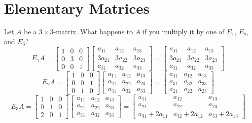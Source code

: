 \section{Elementary Matrices}
Let $A$ be a $3 \times 3$-matrix. What happens to $A$ if you multiply it by 
one of $E_1$, $E_2$, and $E_3$?
\\[8pt]
\[
  E_1A = \begin{bmatrix}
    1 & 0 & 0 \\
    0 & 3 & 0 \\
    0 & 0 & 1
  \end{bmatrix} \begin{bmatrix}
    a_{11} & a_{12} & a_{13} \\
    3a_{21} & 3a_{22} & 3a_{23} \\
    a_{31} & a_{32} & a_{33}
  \end{bmatrix} = \begin{bmatrix}
    a_{11} & a_{12} & a_{13} \\
    3a_{21} & 3a_{22} & 3a_{23} \\
    a_{31} & a_{32} & a_{33} 
  \end{bmatrix}
\]
\[
  E_2A = \begin{bmatrix}
    1 & 0 & 0 \\
    0 & 0 & 1 \\
    0 & 1 & 0
  \end{bmatrix} \begin{bmatrix}
    a_{11} & a_{12} & a_{13} \\
    a_{21} & a_{22} & a_{23} \\
    a_{31} & a_{32} & a_{33}
  \end{bmatrix} = \begin{bmatrix}
    a_{11} & a_{12} & a_{13} \\
    a_{31} & a_{32} & a_{33} \\
    a_{21} & a_{22} & a_{23}
  \end{bmatrix}
\]
\[
  E_3A = \begin{bmatrix}
    1 & 0 & 0 \\
    0 & 1 & 0 \\
    2 & 0 & 1
  \end{bmatrix} \begin{bmatrix}
    a_{11} & a_{12} & a_{13} \\
    a_{21} & a_{22} & a_{23} \\
    a_{31} & a_{32} & a_{33}
  \end{bmatrix} = \begin{bmatrix}
    a_{11} & a_{12} & a_{13} \\
    a_{21} & a_{22} & a_{23} \\
    a_{31} + 2a_{11} & a_{32} + 2a_{12} & a_{33} + 2a_{13}
  \end{bmatrix}
\]
